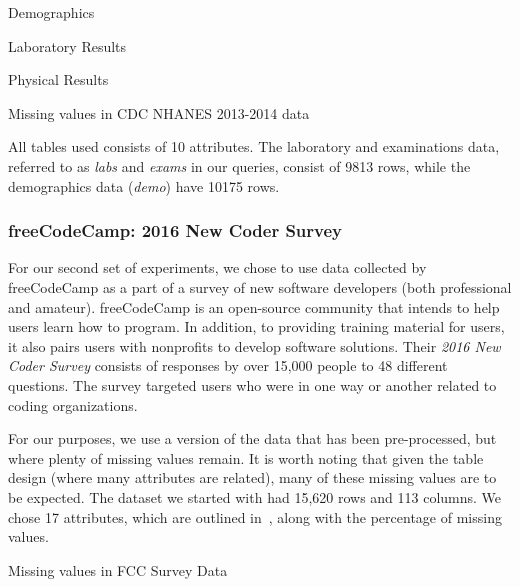 \begin{table}
    \centering
    \begin{subtable}{0.5\textwidth}
        \centering
       
        \caption{Demographics}
    \end{subtable}
    \begin{subtable}{0.5\textwidth}
        \centering
        
        \caption{Laboratory Results}
    \end{subtable}
       \begin{subtable}{0.5\textwidth}
        \centering
        
        \caption{Physical Results}
    \end{subtable}
    \caption{Missing values in CDC NHANES 2013-2014 data}
    \label{table:nhanes-description} 
\end{table}

All tables used consists of 10 attributes. The laboratory and examinations data,
referred to as \textit{labs} and \textit{exams} in our queries, consist of 9813 rows,
while the demographics data (\textit{demo}) have 10175 rows.

\subsubsection{freeCodeCamp: 2016 New Coder Survey}
For our second set of experiments, we chose to use data collected
by freeCodeCamp as a part of a survey of new software developers
(both professional and amateur)\cite{fcc-data}. freeCodeCamp is an open-source
community that intends to help users learn how to program. In addition,
to providing training material for users, it also pairs users with
nonprofits to develop software solutions. Their \textit{2016 New Coder Survey} consists of responses by over 15,000 people to 48 different
questions. The survey targeted users who were in one way or another
related to coding organizations.

For our purposes, we use a version of the data that has been 
pre-processed, but where plenty of missing values remain. It is
worth noting that given the table design (where many attributes
are related), many of these missing values are to be
expected. The dataset we started with had 15,620 rows and 113
columns. We chose 17 attributes, which are outlined in~, along with the percentage of missing values.

\begin{table}
   \centering
    
    \caption{Missing values in FCC Survey Data}
   \label{table:fcc-description} 
\end{table}

